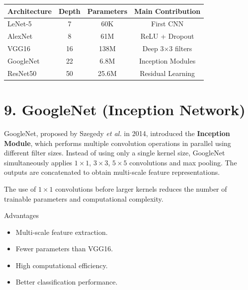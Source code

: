 \documentclass[11pt]{article}
\begin{document}
\begin{center}

\begin{tabular}{|l|c|c|c|}

\hline

Architecture &
Depth &
Parameters &
Main Contribution\\

\hline

LeNet-5 &
7 &
60K &
First CNN\\

AlexNet &
8 &
61M &
ReLU + Dropout\\

VGG16 &
16 &
138M &
Deep 3$\times3$ filters\\

GoogleNet &
22 &
6.8M &
Inception Modules\\

ResNet50 &
50 &
25.6M &
Residual Learning\\

\hline

\end{tabular}

\end{center}

\section*{9. GoogleNet (Inception Network)}

GoogleNet, proposed by Szegedy \textit{et al.} in 2014, introduced the
\textbf{Inception Module}, which performs multiple convolution operations
in parallel using different filter sizes. Instead of using only a single
kernel size, GoogleNet simultaneously applies $1\times1$, $3\times3$,
$5\times5$ convolutions and max pooling. The outputs are concatenated to
obtain multi-scale feature representations.

The use of $1\times1$ convolutions before larger kernels reduces the
number of trainable parameters and computational complexity.


Advantages

\begin{itemize}
\item Multi-scale feature extraction.
\item Fewer parameters than VGG16.
\item High computational efficiency.
\item Better classification performance.
\end{itemize}
\end{document}
